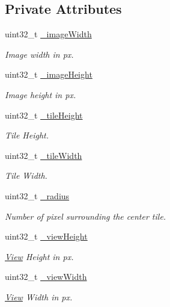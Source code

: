 \subsection*{Private Attributes}
\begin{DoxyCompactItemize}
\item 
uint32\+\_\+t \hyperlink{classfi_1_1HTGSViewRequestData_ab1404ad4efa162c125feda6f02a48edc}{\+\_\+image\+Width}
\begin{DoxyCompactList}\small\item\em Image width in px. \end{DoxyCompactList}\item 
uint32\+\_\+t \hyperlink{classfi_1_1HTGSViewRequestData_a59bbd65badee901cce6b56b409ebd4e9}{\+\_\+image\+Height}
\begin{DoxyCompactList}\small\item\em Image height in px. \end{DoxyCompactList}\item 
uint32\+\_\+t \hyperlink{classfi_1_1HTGSViewRequestData_a2480147677b6c45055cf82e4650d8ea1}{\+\_\+tile\+Height}
\begin{DoxyCompactList}\small\item\em Tile Height. \end{DoxyCompactList}\item 
uint32\+\_\+t \hyperlink{classfi_1_1HTGSViewRequestData_ad17d5ed86e630dd54921c6a2663aceae}{\+\_\+tile\+Width}
\begin{DoxyCompactList}\small\item\em Tile Width. \end{DoxyCompactList}\item 
uint32\+\_\+t \hyperlink{classfi_1_1HTGSViewRequestData_abbd88a3c902e9b8d4a7dc75db51d43df}{\+\_\+radius}
\begin{DoxyCompactList}\small\item\em Number of pixel surrounding the center tile. \end{DoxyCompactList}\item 
uint32\+\_\+t \hyperlink{classfi_1_1HTGSViewRequestData_a48a252c411cf994d1e4b4edf028dcb9a}{\+\_\+view\+Height}
\begin{DoxyCompactList}\small\item\em \hyperlink{classfi_1_1View}{View} Height in px. \end{DoxyCompactList}\item 
uint32\+\_\+t \hyperlink{classfi_1_1HTGSViewRequestData_acc0d6a79e73c3052f0fbff6add02240b}{\+\_\+view\+Width}
\begin{DoxyCompactList}\small\item\em \hyperlink{classfi_1_1View}{View} Width in px. \end{DoxyCompactList}\item 

\end{DoxyCompactItemize}
